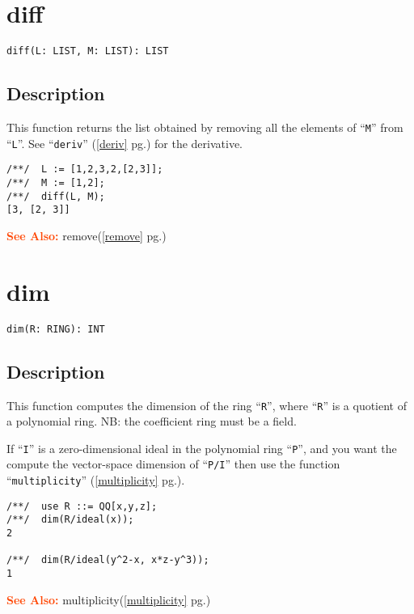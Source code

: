 \documentclass[a4paper]{mybook}
\newenvironment{command}{}{} %
\newcommand\SeeAlso{\par\textcolor{OrangeRed}{\textbf{\large See Also: }}}
\begin{document}
\section{diff}
\label{diff}
\begin{command} %


\begin{Verbatim}[label=syntax, rulecolor=\color{MidnightBlue},
frame=single]
diff(L: LIST, M: LIST): LIST
\end{Verbatim}


\subsection*{Description}

This function returns the list obtained by removing all the elements
of ``\verb&M&'' from ``\verb&L&''.  See ``\verb&deriv&'' (\ref{deriv} pg.\pageref{deriv}) for the derivative.
\begin{Verbatim}[label=example, rulecolor=\color{PineGreen}, frame=single]
/**/  L := [1,2,3,2,[2,3]];
/**/  M := [1,2];
/**/  diff(L, M);
[3, [2, 3]]
\end{Verbatim}


\SeeAlso %
  remove(\ref{remove} pg.\pageref{remove})
\end{command} %

\section{dim}
\label{dim}
\begin{command} %


\begin{Verbatim}[label=syntax, rulecolor=\color{MidnightBlue},
frame=single]
dim(R: RING): INT
\end{Verbatim}


\subsection*{Description}

This function computes the dimension of the ring ``\verb&R&'', where ``\verb&R&'' is a
quotient of a polynomial ring.  NB: the coefficient ring must be a field.
\par 
If ``\verb&I&'' is a zero-dimensional ideal in the polynomial ring ``\verb&P&'', and
you want the compute the vector-space dimension of ``\verb&P/I&'' then use the
function ``\verb&multiplicity&'' (\ref{multiplicity} pg.\pageref{multiplicity}).
\begin{Verbatim}[label=example, rulecolor=\color{PineGreen}, frame=single]
/**/  use R ::= QQ[x,y,z];
/**/  dim(R/ideal(x));
2

/**/  dim(R/ideal(y^2-x, x*z-y^3));
1
\end{Verbatim}


\SeeAlso %
  multiplicity(\ref{multiplicity} pg.\pageref{multiplicity})
\end{command} %
\end{document}
